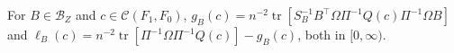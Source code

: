 For \(B\in\mathcal B_Z\) and \(c\in\mathcal C(F_1,F_0)\), \(g_B(c)=n^{-2}\operatorname{tr}[S_B^{-1}B^{\top}\Omega\Pi^{-1}Q(c)\Pi^{-1}\Omega B]\) and \(\ell_B(c)=n^{-2}\operatorname{tr}[\Pi^{-1}\Omega\Pi^{-1}Q(c)]-g_B(c)\), both in \([0,\infty)\).